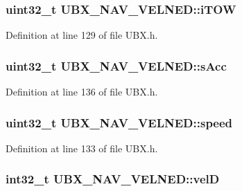 \hypertarget{struct_u_b_x___n_a_v___v_e_l_n_e_d_af2aa06ea75e992d2933728a9eb390734}{
\subsubsection[{i\-T\-O\-W}]{\setlength{\rightskip}{0pt plus 5cm}uint32\-\_\-t {\bf \-U\-B\-X\-\_\-\-N\-A\-V\-\_\-\-V\-E\-L\-N\-E\-D\-::i\-T\-O\-W}}}\label{struct_u_b_x___n_a_v___v_e_l_n_e_d_af2aa06ea75e992d2933728a9eb390734}


\-Definition at line 129 of file \-U\-B\-X.\-h.

\hypertarget{struct_u_b_x___n_a_v___v_e_l_n_e_d_a50bfd12e0c7398ab16e312e6a9332e7d}{
\subsubsection[{s\-Acc}]{\setlength{\rightskip}{0pt plus 5cm}uint32\-\_\-t {\bf \-U\-B\-X\-\_\-\-N\-A\-V\-\_\-\-V\-E\-L\-N\-E\-D\-::s\-Acc}}}\label{struct_u_b_x___n_a_v___v_e_l_n_e_d_a50bfd12e0c7398ab16e312e6a9332e7d}


\-Definition at line 136 of file \-U\-B\-X.\-h.

\hypertarget{struct_u_b_x___n_a_v___v_e_l_n_e_d_a16a2a64917c6151546e60e1eb04eb4f6}{
\subsubsection[{speed}]{\setlength{\rightskip}{0pt plus 5cm}uint32\-\_\-t {\bf \-U\-B\-X\-\_\-\-N\-A\-V\-\_\-\-V\-E\-L\-N\-E\-D\-::speed}}}\label{struct_u_b_x___n_a_v___v_e_l_n_e_d_a16a2a64917c6151546e60e1eb04eb4f6}


\-Definition at line 133 of file \-U\-B\-X.\-h.

\hypertarget{struct_u_b_x___n_a_v___v_e_l_n_e_d_a3dcace94a7b7317b432bcdeb69271326}{
\subsubsection[{vel\-D}]{\setlength{\rightskip}{0pt plus 5cm}int32\-\_\-t {\bf \-U\-B\-X\-\_\-\-N\-A\-V\-\_\-\-V\-E\-L\-N\-E\-D\-::vel\-D}}}\label{struct_u_b_x___n_a_v___v_e_l_n_e_d_a3dcace94a7b7317b432bcdeb69271326}



